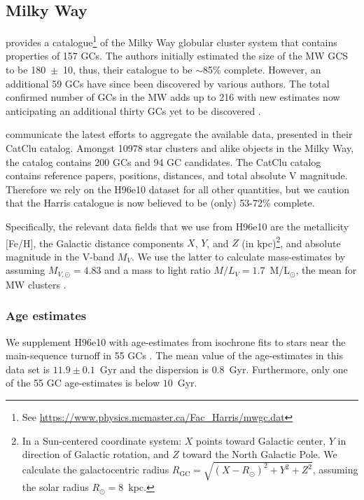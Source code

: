 \documentclass[a4paper,fleqn,usenatbib]{mnras}
\begin{document}
\subsection{Milky Way}
\label{sec:milkyway}
\citet[][2010 edition; hereafter H96e10]{1996AJ....112.1487H} provides a
catalogue\footnote{See \url{https://www.physics.mcmaster.ca/Fac_Harris/mwgc.dat}} 
of the Milky Way globular cluster system that contains properties of 
157 GCs. The authors initially estimated the size of the MW GCS to be 180~$\pm$~10,
thus, their catalogue to be $\sim$85\% complete. However, an additional 59 GCs 
have since been discovered by various authors. The total confirmed number of GCs 
in the MW adds up to 216 with new estimates now anticipating an additional thirty 
GCs yet to be discovered \citep[e.g.][and references therein]{2018ApJ...863L..38R}.

\citet{2019AJ....157...12B} communicate the latest efforts to aggregate the
available data, presented in their CatClu catalog. Amongst 10978 star clusters 
and alike objects in the Milky Way, the catalog contains 200 GCs and 94 GC 
candidates. The CatClu catalog contains reference papers, positions, distances,
and total absolute V magnitude. Therefore we rely on the H96e10 dataset for all
other quantities, but we caution that the Harris catalogue is now believed to be (only) 53-72\% complete. 

Specifically, the relevant data fields that we use from H96e10 are the 
metallicity [Fe/H], the Galactic distance components $X$, $Y$, and $Z$ (in 
kpc)\footnote{In a Sun-centered coordinate system: $X$ points toward Galactic 
center, $Y$ in direction of Galactic rotation, and $Z$ toward the North Galactic 
Pole. We calculate the galactocentric radius $R_{\text{GC}}=\sqrt{(X-R_\odot)^2
+ Y^2 + Z^2}$, assuming the solar radius $R_\odot=8$~kpc.}, and absolute 
magnitude in the V-band $M_V$. We use the latter to calculate mass-estimates by 
assuming $M_{V,\odot}=4.83$ and a mass to light ratio $M/L_V = 1.7$~M/L$_{\odot}$, 
the mean for MW clusters \citep{2005ApJS..161..304M}.

\subsubsection*{Age estimates}
We supplement H96e10 with age-estimates from isochrone fits to stars
near the main-sequence turnoff in 55 GCs \citep[][hereafter V13]{2013ApJ...775..134V}.
The mean value of the age-estimates in this data set is $11.9 \pm 0.1$~Gyr and 
the dispersion is $0.8$~Gyr. Furthermore, only one of the 55 GC age-estimates is
below $10$~Gyr. 
\end{document}
